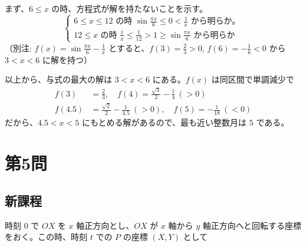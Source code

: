 \documentclass[../main.tex]{subfiles}
\begin{document}
\noindent
まず、$6 \le x$ の時、方程式が解を持たないことを示す。
\[
  \begin{cases}
    6 \le x \le 12 \text{ の時 } \sin\frac{\pi x}{6} \le 0 < \frac{1}{x} \text{ から明らか。} \\
    12 \le x \text{ の時 } \frac{1}{x} \le \frac{1}{12} > 1 \ge \sin\frac{\pi x}{6} \text{ から明らか}
  \end{cases}
\]
（別注: $f(x) = \sin\frac{\pi x}{6} - \frac{1}{x}$ とすると、$f(3) = \frac{2}{3} > 0$, $f(6) = -\frac{1}{6} < 0$ から $3 < x < 6$ に解を持つ）

\medskip
\noindent
以上から、与式の最大の解は $3 < x < 6$ にある。$f(x)$ は同区間で単調減少で
\begin{align*}
  f(3) &= \frac{2}{3}, \quad f(4) = \frac{\sqrt{3}}{2} - \frac{1}{4} \ ( > 0) \\
  f(4.5) &= \frac{\sqrt{2}}{2} - \frac{1}{4.5} \ ( > 0), \quad f(5) = -\frac{1}{18} \ ( < 0)
\end{align*}
だから、$4.5 < x < 5$ にもとめる解があるので、最も近い整数月は $5$ である。

\newpage

\section*{第5問}

\subsection*{新課程}

\noindent
[\textbf{解}] 時刻 $0$ で $OX$ を $x$ 軸正方向とし、$OX$ が $x$ 軸から $y$ 軸正方向へと回転する座標をおく。この時、時刻 $t$ での $P$ の座標 $(X, Y)$ として

\begin{center}
\end{center}
\end{document}
